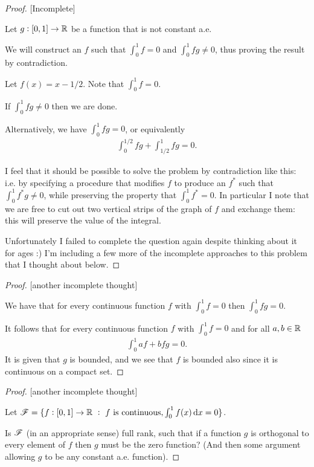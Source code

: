 \begin{proof}

  [Incomplete]

  Let $g: [0, 1] \to \mathbb{R}$ be a function that is not constant a.e.

  We will construct an $f$ such that $\int_0^1 f = 0$ and $\int_0^1 fg \neq 0$, thus proving the result by
  contradiction.

  Let $f(x) = x - 1/2$. Note that $\int_0^1 f = 0$.

  If $\int_0^1 fg \neq 0$ then we are done.

  Alternatively, we have $\int_0^1 fg = 0$, or equivalently
  \begin{align*}
    \int_0^{1/2} fg + \int_{1/2}^1 fg = 0.
  \end{align*}

  I feel that it should be possible to solve the problem by contradiction like this: i.e. by specifying a
  procedure that modifies $f$ to produce an $f^*$ such that $\int_0^1 f^*g \neq 0$, while preserving the property that $\int_0^1 f^* = 0$. In particular I note that we
  are free to cut out two vertical strips of the graph of $f$ and exchange them: this will preserve the value
  of the integral.

  Unfortunately I failed to complete the question again despite thinking about it for ages :) I'm including a
  few more of the incomplete approaches to this problem that I thought about below.
\end{proof}


\begin{proof}

  [another incomplete thought]

  We have that for every continuous function $f$ with $\int_0^1 f = 0$ then $\int_0^1 fg = 0$.

  It follows that for every continuous function $f$ with $\int_0^1 f = 0$ and for all $a, b \in \mathbb{R}$
  \begin{align*}
    \int_0^1 af + bfg = 0.
  \end{align*}
  It is given that $g$ is bounded, and we see that $f$ is bounded also since it is continuous on a compact set.

\end{proof}


\begin{proof}

  [another incomplete thought]

  Let $\ms F = \{f: [0, 1] \to \R ~:~ f \text{~is continuous}, \int_0^1 f(x) \dx = 0 \}$.

  Is $\mathscr F$ (in an appropriate sense) full rank, such that if a function $g$ is orthogonal to every element
  of $f$ then $g$ must be the zero function? (And then some argument allowing $g$ to be any constant a.e.
  function).
\end{proof}


